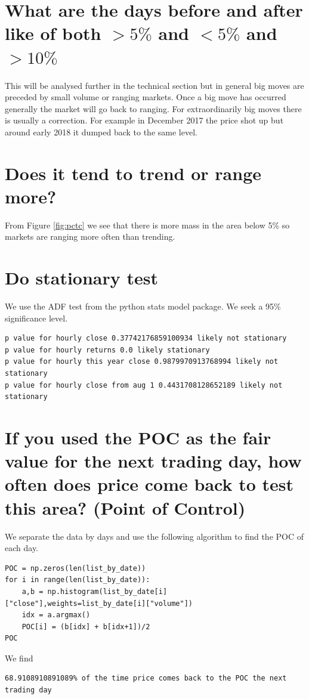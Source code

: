 \section{ What are the days before and after like of both $>5 \% $ and $<5 \% $ and $> 10 \% $}
This will be analysed further in the technical section but in general big moves are preceded by small volume or ranging markets. Once a big move has occurred generally the market will go back to ranging.
For extraordinarily big moves there is usually a correction. For example in December 2017 the price shot up but around early 2018 it dumped back to the same level.
\section{ Does it tend to trend or range more?}
From Figure \ref{fig:pctc} we see that there is more mass in the area below 5\% so markets are ranging more often than trending.
\section{ Do stationary test}
We use the ADF test from the python stats model package. We seek a 95\% significance level.

\begin{verbatim}
p value for hourly close 0.37742176859100934 likely not stationary
p value for hourly returns 0.0 likely stationary
p value for hourly this year close 0.9879970913768994 likely not stationary
p value for hourly close from aug 1 0.4431708128652189 likely not stationary
\end{verbatim}

\section{If you used the POC as the fair value for the next trading day, how often does price come back to test this area? (Point of Control)}
We separate the data by days and use the following algorithm to find the POC of each day.

\begin{verbatim}
POC = np.zeros(len(list_by_date))
for i in range(len(list_by_date)):
    a,b = np.histogram(list_by_date[i]["close"],weights=list_by_date[i]["volume"])
    idx = a.argmax()
    POC[i] = (b[idx] + b[idx+1])/2
POC
\end{verbatim}
We find

\begin{verbatim}
68.9108910891089% of the time price comes back to the POC the next trading day
\end{verbatim}
